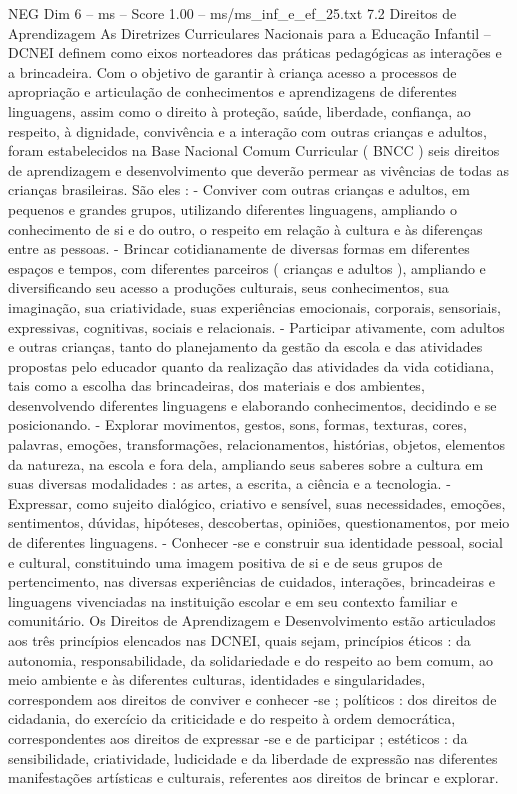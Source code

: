\begin{textsample}{NEG Dim 6 – ms – Score 1.00 – ms/ms\_inf\_e\_ef\_25.txt}  \label{ex:f6_neg_237}
7.2 Direitos de Aprendizagem As Diretrizes Curriculares Nacionais para a Educação Infantil – DCNEI definem como eixos norteadores das práticas pedagógicas as interações e a brincadeira.
Com o objetivo de garantir à criança acesso a processos de apropriação e articulação de conhecimentos e aprendizagens de diferentes linguagens, assim como o direito à proteção, saúde, liberdade, confiança, ao respeito, à dignidade, convivência e a interação com outras crianças e adultos, foram estabelecidos na Base Nacional Comum Curricular ( BNCC ) seis direitos de aprendizagem e desenvolvimento que deverão permear as vivências de todas as crianças brasileiras.
São eles : - Conviver com outras crianças e adultos, em pequenos e grandes grupos, utilizando diferentes linguagens, ampliando o conhecimento de si e do outro, o respeito em relação à cultura e às diferenças entre as pessoas. - Brincar cotidianamente de diversas formas em diferentes espaços e tempos, com diferentes parceiros ( crianças e adultos ), ampliando e diversificando seu acesso a produções culturais, seus conhecimentos, sua imaginação, sua criatividade, suas experiências emocionais, corporais, sensoriais, expressivas, cognitivas, sociais e relacionais. - Participar ativamente, com adultos e outras crianças, tanto do planejamento da gestão da escola e das atividades propostas pelo educador quanto da realização das atividades da vida cotidiana, tais como a escolha das brincadeiras, dos materiais e dos ambientes, desenvolvendo diferentes linguagens e elaborando conhecimentos, decidindo e se posicionando. - Explorar movimentos, gestos, sons, formas, texturas, cores, palavras, emoções, transformações, relacionamentos, histórias, objetos, elementos da natureza, na escola e fora dela, ampliando seus saberes sobre a cultura em suas diversas modalidades : as artes, a escrita, a ciência e a tecnologia. - Expressar, como sujeito dialógico, criativo e sensível, suas necessidades, emoções, sentimentos, dúvidas, hipóteses, descobertas, opiniões, questionamentos, por meio de diferentes linguagens. - Conhecer -se e construir sua identidade pessoal, social e cultural, constituindo uma imagem positiva de si e de seus grupos de pertencimento, nas diversas experiências de cuidados, interações, brincadeiras e linguagens vivenciadas na instituição escolar e em seu contexto familiar e comunitário.
Os Direitos de Aprendizagem e Desenvolvimento estão articulados aos três princípios elencados nas DCNEI, quais sejam, princípios éticos : da autonomia, responsabilidade, da solidariedade e do respeito ao bem comum, ao meio ambiente e às diferentes culturas, identidades e singularidades, correspondem aos direitos de conviver e conhecer -se ; políticos : dos direitos de cidadania, do exercício da criticidade e do respeito à ordem democrática, correspondentes aos direitos de expressar -se e de participar ; estéticos : da sensibilidade, criatividade, ludicidade e da liberdade de expressão nas diferentes manifestações artísticas e culturais, referentes aos direitos de brincar e explorar.

\end{textsample}
